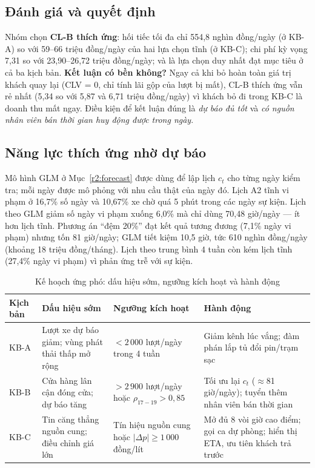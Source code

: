 {\subsection{Đánh giá và quyết định}
Nhóm chọn \textbf{CL-B thích ứng}: hối tiếc tối đa chỉ 554,8 nghìn đồng/ngày
(ở KB-A) so với 59--66 triệu đồng/ngày của hai lựa chọn tĩnh (ở KB-C); chi phí kỳ
vọng 7,31 so với 23,90--26,72 triệu đồng/ngày; và là lựa chọn duy nhất đạt mục
tiêu ở cả ba kịch bản.
\textbf{Kết luận có bền không?} Ngay cả khi bỏ hoàn toàn giá trị khách quay lại
(CLV = 0, chỉ tính lãi gộp của lượt bị mất), CL-B thích ứng vẫn rẻ nhất
(5,34 so với 5,87 và 6,71 triệu đồng/ngày) vì khách bỏ đi trong KB-C là doanh
thu mất ngay. Điều kiện để kết luận đúng là \emph{dự báo đủ tốt} và \emph{có
nguồn nhân viên bán thời gian huy động được trong ngày}.

\subsection{Năng lực thích ứng nhờ dự báo}
\label{r3:ml-staff}
Mô hình GLM ở Mục~\ref{r2:forecast} được dùng để lập lịch $c_t$ cho từng ngày
kiểm tra; mỗi ngày được mô phỏng với nhu cầu thật của ngày đó.
Lịch A2 tĩnh vi phạm ở 16,7\% số ngày và 10,67\% xe chờ quá 5 phút trong các
ngày sự kiện. Lịch theo GLM giảm số ngày vi phạm xuống 6,0\% mà chỉ dùng 70,48
giờ/ngày --- ít hơn lịch tĩnh. Phương án ``đệm 20\%'' đạt kết quả tương đương
(7,1\% ngày vi phạm) nhưng tốn 81 giờ/ngày; GLM tiết kiệm 10,5 giờ, tức 610
nghìn đồng/ngày (khoảng 18 triệu đồng/tháng). Lịch theo trung bình 4 tuần còn
kém lịch tĩnh (27,4\% ngày vi phạm) vì phản ứng trễ với sự kiện.

\begin{table}[htbp]\centering\small
\caption{Kế hoạch ứng phó: dấu hiệu sớm, ngưỡng kích hoạt và hành động}\label{r3:playbook}
\begin{tabularx}{\linewidth}{@{}p{14mm}Y Y Y@{}}
\toprule
Kịch bản & Dấu hiệu sớm & Ngưỡng kích hoạt & Hành động \\
\midrule
KB-A & Lượt xe dự báo giảm; vùng phát thải thấp mở rộng & $<2\,000$ lượt/ngày trong 4 tuần & Giảm kênh lúc vắng; đàm phán lắp tủ đổi pin/trạm sạc~\cite{vgx} \\
KB-B & Cửa hàng lân cận đóng cửa; dự báo tăng & $>2\,900$ lượt/ngày hoặc $\rho_{17-19}>0{,}85$ & Tối ưu lại $c_t$ ($\approx$81 giờ/ngày); tuyển thêm nhân viên bán thời gian \\
KB-C & Tin căng thẳng nguồn cung; điều chỉnh giá lớn & Tín hiệu nguồn cung hoặc $|\Delta p|\ge1\,000$ đồng/lít & Mở đủ 8 vòi giờ cao điểm; gọi ca dự phòng; hiển thị ETA, ưu tiên khách trả trước \\
\bottomrule
\end{tabularx}
\end{table}

}
